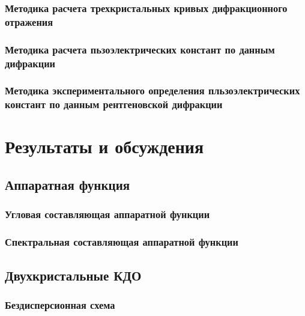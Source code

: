 \documentclass[pdftex,a4paper,14pt,english,russian]{extarticle}
\numberwithin{equation}{subsection}
\newcounter{subsubsubsection}[subsubsection]
\begin{document}
    \subsubsection{Методика расчета трехкристальных кривых дифракционного отражения}
        
        
    \subsubsection{Методика расчета пьзоэлектрических констант по данным дифракции}
      
      \subsubsection{Методика экспериментального определения
      пльзоэлектрических констант по данным рентгеновской дифракции}
            
            


\newpage
\section{Результаты и обсуждения}
  \subsection{Аппаратная функция}
  \subsubsection{Угловая составляющая аппаратной функции}
    
  \subsubsection{Спектральная составляющая аппаратной функции}
      
  \subsection{Двухкристальные КДО}

    \subsubsection{Бездисперсионная схема}
    
\end{document}
